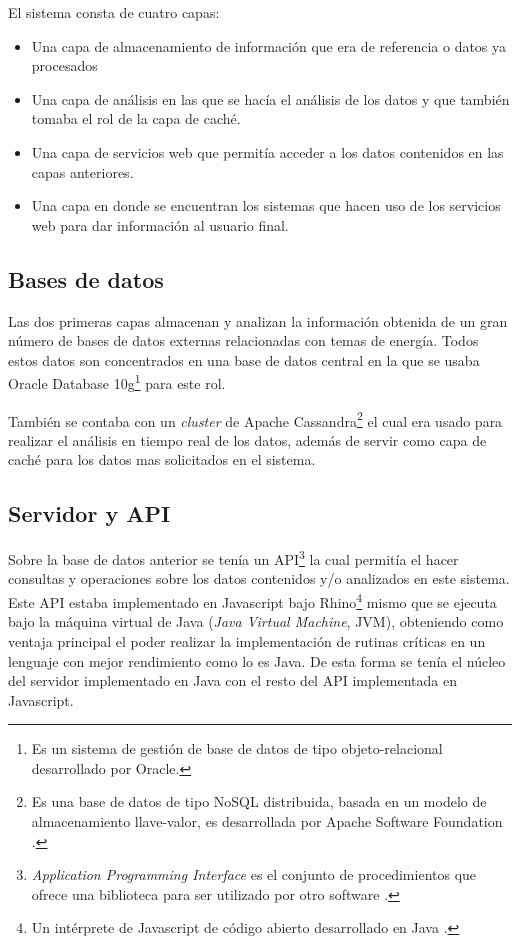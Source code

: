 El sistema consta de cuatro capas:

\begin{itemize}
\item Una capa de almacenamiento de información que era de referencia
  o datos ya procesados
\item Una capa de análisis en las que se hacía el análisis de los datos
  y que también tomaba el rol de la capa de caché.
\item Una capa de servicios web que permitía acceder a los datos contenidos
  en las capas anteriores.
\item Una capa en donde se encuentran los sistemas que hacen uso de los
  servicios web para dar información al usuario final.
\end{itemize}

\subsection{Bases de datos}
Las dos primeras capas almacenan y analizan la información obtenida
de un gran número de bases de datos externas relacionadas con temas
de energía. Todos estos datos son concentrados en una base de datos
central en la que se usaba Oracle Database 10g\footnote{Es un sistema de
  gestión de base de datos de tipo objeto-relacional desarrollado por Oracle.}
para este rol.

También se contaba con un \textit{cluster} de Apache Cassandra\footnote{Es
  una base de datos de tipo NoSQL distribuida, basada en un modelo de
  almacenamiento llave-valor, es desarrollada por Apache Software
  Foundation \cite{19_apache_cassandra}.} el cual era usado para realizar
el análisis en tiempo real de los datos, además de servir como capa
de caché para los datos mas solicitados en el sistema.

\subsection{Servidor y API}
Sobre la base de datos anterior se tenía un API\footnote{
  \textit{Application Programming Interface} es el conjunto de procedimientos
  que ofrece una biblioteca para ser utilizado por otro
  software \cite{3_sommerville_2011}.}
la cual permitía el hacer consultas y operaciones sobre los datos contenidos
y/o analizados en este sistema.
Este API estaba implementado en Javascript bajo Rhino\footnote{Un intérprete
  de Javascript de código abierto desarrollado en Java \cite{20_mozilla_rhino}.}
mismo que se ejecuta bajo la máquina virtual de Java (\textit{Java Virtual Machine},
JVM), obteniendo como ventaja principal el poder realizar la implementación
de rutinas críticas en un lenguaje con mejor rendimiento como lo es Java.
De esta forma se tenía el núcleo del servidor implementado en Java con el
resto del API implementada en Javascript.

